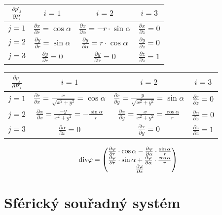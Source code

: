 \begin{tabular}{| c || c | c | c |}
\hline
\(\frac{\partial p'_j}{\partial P_i}\) & \(i=1\) & \(i=2\) & \(i=3\) \\
\hline
\hline
\(j=1\) & \(\frac{\partial x}{\partial r} = \cos \alpha\) & \(\frac{\partial x}{\partial \alpha} = -r \cdot \sin \alpha\) & \(\frac{\partial x}{\partial z} = 0\) \\
\hline
\(j=2\) & \(\frac{\partial y}{\partial r} = \sin \alpha\) & \(\frac{\partial y}{\partial \alpha} = r \cdot \cos \alpha\) & \(\frac{\partial y}{\partial z} = 0\) \\
\hline
\(j=3\) & \(\frac{\partial y}{\partial r} = 0\) & \(\frac{\partial y}{\partial \alpha} = 0\) & \(\frac{\partial z}{\partial z} = 1\) \\
\hline
\end{tabular}

\begin{tabular}{| c || c | c | c |}
\hline
\(\frac{\partial p_j}{\partial P'_i}\) & \(i=1\) & \(i=2\) & \(i=3\)\\
\hline
\hline
\(j=1\) & \(\frac{\partial r}{\partial x} = \frac{x}{\sqrt{x^2 + y^2}} = \cos \alpha\) & \(\frac{\partial r}{\partial y} = \frac{y}{\sqrt{x^2 + y^2}} = \sin \alpha\) & \(\frac{\partial r}{\partial z} = 0\)\\
\hline
\(j=2\) & \(\frac{\partial \alpha}{\partial x} = \frac{-y}{x^2 + y^2} = -\frac{\sin \alpha}{r}\) & \(\frac{\partial \alpha}{\partial y} = \frac{x}{x^2 + y^2} = \frac{\cos \alpha}{r}\) & \(\frac{\partial \alpha}{\partial z} = 0\)\\
\hline
\(j=3\) & \(\frac{\partial \alpha}{\partial x} = 0\) & \(\frac{\partial \alpha}{\partial y} = 0\) & \(\frac{\partial z}{\partial z} = 1\)\\
\hline
\end{tabular}

\begin{equation}
\mathrm{div}{\varphi} = \begin{pmatrix}
\frac{\partial \varphi}{\partial r} \cdot \cos \alpha - \frac{\partial \varphi}{\partial \alpha} \cdot \frac{\sin \alpha}{r} \\
\frac{\partial \varphi}{\partial r} \cdot \sin \alpha + \frac{\partial \varphi}{\partial \alpha} \cdot \frac{\cos \alpha}{r} \\
\frac{\partial \varphi}{\partial z}  
\end{pmatrix}
\end{equation}


\section{Sférický souřadný systém}

